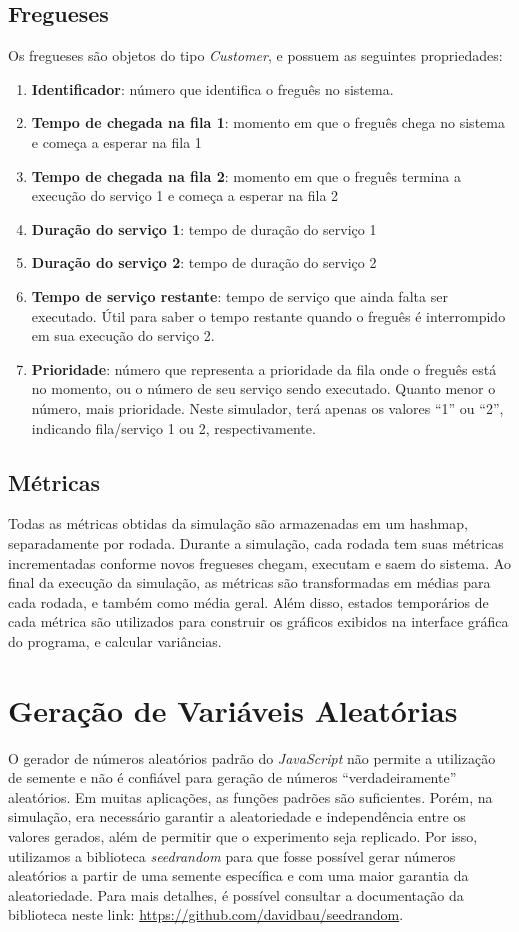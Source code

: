 \documentclass[a4paper,12pt]{report}
\begin{document}
\subsection{Fregueses}
Os fregueses são objetos do tipo \emph{Customer}, e possuem as seguintes propriedades:
\begin{enumerate}
	\itemsep1em
	\item \textbf{Identificador}: número que identifica o freguês no sistema.
    \item \textbf{Tempo de chegada na fila 1}: momento em que o freguês chega no sistema e começa a esperar na fila 1
    \item \textbf{Tempo de chegada na fila 2}: momento em que o freguês termina a execução do serviço 1 e começa a esperar na fila 2
    \item \textbf{Duração do serviço 1}: tempo de duração do serviço 1
    \item \textbf{Duração do serviço 2}: tempo de duração do serviço 2
    \item \textbf{Tempo de serviço restante}: tempo de serviço que ainda falta ser executado. Útil para saber o tempo restante quando o freguês é interrompido em sua execução do serviço 2.
    \item \textbf{Prioridade}: número que representa a prioridade da fila onde o freguês está no momento, ou o número de seu serviço sendo executado. Quanto menor o número, mais prioridade. Neste simulador, terá apenas os valores ``1'' ou ``2'', indicando fila/serviço 1 ou 2, respectivamente.
\end{enumerate}

\subsection{Métricas}

Todas as métricas obtidas da simulação são armazenadas em um hashmap, separadamente por rodada. Durante a simulação, cada rodada tem suas métricas incrementadas conforme novos fregueses chegam, executam e saem do sistema. Ao final da execução da simulação, as métricas são transformadas em médias para cada rodada, e também como média geral. Além disso, estados temporários de cada métrica são utilizados para construir os gráficos exibidos na interface gráfica do programa, e calcular variâncias.

\section{Geração de Variáveis Aleatórias}
O gerador de números aleatórios padrão do \emph{JavaScript} não permite a utilização de semente e não é confiável para geração de números ``verdadeiramente'' aleatórios. Em muitas aplicações, as funções padrões são suficientes. Porém, na simulação, era necessário garantir a aleatoriedade e independência entre os valores gerados, além de permitir que o experimento seja replicado. Por isso, utilizamos a biblioteca \emph{seedrandom} para que fosse possível gerar números aleatórios a partir de uma semente específica e com uma maior garantia da aleatoriedade. Para mais detalhes, é possível consultar a documentação da biblioteca neste link: \url{https://github.com/davidbau/seedrandom}.
\end{document}
